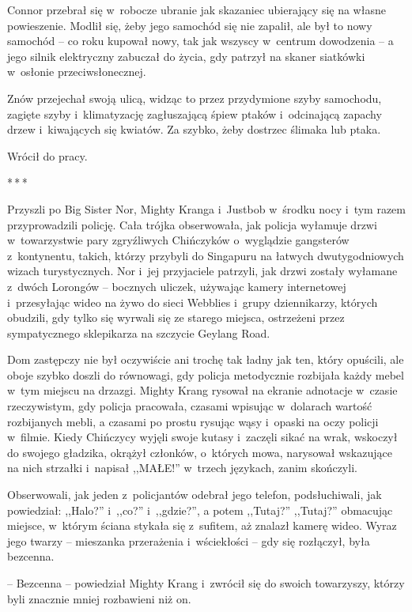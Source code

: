 \documentclass[oneside,polish,11pt,rmheadings]{mwbk}
\newcommand{\threeast}{\par\centerline{*\,*\,*}\medskip\par}
\begin{document}
Connor przebrał się w~robocze ubranie jak skazaniec ubierający się na własne powieszenie. Modlił się, żeby jego samochód się nie zapalił, ale był to nowy samochód -- co roku kupował nowy, tak jak wszyscy w~centrum dowodzenia -- a jego silnik elektryczny zabuczał do życia, gdy patrzył na skaner siatkówki w~osłonie przeciwsłonecznej.

Znów przejechał swoją ulicą, widząc to przez przydymione szyby samochodu, zagięte szyby i~klimatyzację zagłuszającą śpiew ptaków i~odcinającą zapachy drzew i~kiwających się kwiatów. Za szybko, żeby dostrzec ślimaka lub ptaka.

Wrócił do pracy.

\bigskip
\threeast

Przyszli po Big Sister Nor, Mighty Kranga i~Justbob w~środku nocy i~tym razem przyprowadzili policję. Cała trójka obserwowała, jak policja wyłamuje drzwi w~towarzystwie pary zgryźliwych Chińczyków o~wyglądzie gangsterów z~kontynentu, takich, którzy przybyli do Singapuru na łatwych dwutygodniowych wizach turystycznych. Nor i~jej przyjaciele patrzyli, jak drzwi zostały wyłamane z~dwóch Lorongów -- bocznych uliczek, używając kamery internetowej i~przesyłając wideo na żywo do sieci Webblies i~grupy dziennikarzy, których obudzili, gdy tylko się wyrwali się ze starego miejsca, ostrzeżeni przez sympatycznego sklepikarza na szczycie Geylang Road.

Dom zastępczy nie był oczywiście ani trochę tak ładny jak ten, który opuścili, ale oboje szybko doszli do równowagi, gdy policja metodycznie rozbijała każdy mebel w~tym miejscu na drzazgi. Mighty Krang rysował na ekranie adnotacje w~czasie rzeczywistym, gdy policja pracowała, czasami wpisując w~dolarach wartość rozbijanych mebli, a czasami po prostu rysując wąsy i~opaski na oczy policji w~filmie. Kiedy Chińczycy wyjęli swoje kutasy i~zaczęli sikać na wrak, wskoczył do swojego gładzika, okrążył członków, o~których mowa, narysował wskazujące na nich strzałki i~napisał ,,MAŁE!'' w~trzech językach, zanim skończyli.

Obserwowali, jak jeden z~policjantów odebrał jego telefon, podsłuchiwali, jak powiedział: ,,Halo?'' i~,,co?'' i~,,gdzie?'', a potem ,,Tutaj?'' ,,Tutaj?'' obmacując miejsce, w~którym ściana stykała się z~sufitem, aż znalazł kamerę wideo. Wyraz jego twarzy -- mieszanka przerażenia i~wściekłości -- gdy się rozłączył, była bezcenna.

-- Bezcenna -- powiedział Mighty Krang i~zwrócił się do swoich towarzyszy, którzy byli znacznie mniej rozbawieni niż on.
\end{document}
